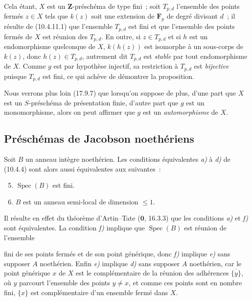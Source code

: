 Cela étant, $X$ est un $\mathbf Z$-préschéma de type fini~; soit $T_{p,d}$
l'ensemble des points fermés $z\in X$ tels que $k(z)$ soit une extension de
$\mathbf F_p$ de degré divisant $d$~; il résulte de (10.4.11.1) que l'ensemble
$T_{p,d}$ est fini et que l'ensemble des points fermés de $X$ est réunion des
$T_{p,d}$. En outre, si $z\in T_{p,d}$ et si $h$ est un endomorphisme
quelconque de $X$, $k(h(z))$ est isomorphe à un sous-corps de $k(z)$, donc
$h(z)\in T_{p,d}$, autrement dit $T_{p,d}$ est \emph{stable} par tout
endomorphisme de $X$. Comme $g$ est par hypothèse injectif, sa restriction à
$T_{p,d}$ est \emph{bijective} puisque $T_{p,d}$ est fini, ce qui achève de
démontrer la proposition.

Nous verrons plus loin (17.9.7) que lorsqu'on suppose de plus, d'une part que
$X$ est un $S$-préschéma de présentation finie, d'autre part que $g$ est un
monomorphisme, alors on peut affirmer que $g$ est un \emph{automorphisme} de
$X$.

\subsection{Préschémas de Jacobson noethériens}
\label{subsection:IV.10.5-fr}

\begin{proposition}[10.5.1]
\label{IV.10.5.1-fr}
Soit $B$ un anneau intègre noethérien. Les conditions équivalentes \emph{a)} à
\emph{d)} de (10.4.4) sont alors aussi équivalentes aux suivantes~:
\begin{enumerate}[label=\emph{\alph*)}]
  \setcounter{enumi}{4}
  \item $\operatorname{Spec}(B)$ est fini.
  \item $B$ est un anneau semi-local de dimension $\leq1$.
\end{enumerate}
\end{proposition}

Il résulte en effet du théorème d'Artin--Tate ($\mathbf 0$, 16.3.3) que les
conditions \emph{a)} et \emph{f)} sont équivalentes. La condition \emph{f)}
implique que $\operatorname{Spec}(B)$ est réunion de l'ensemble

fini de ses points fermés et de son point générique, donc \emph{f)} implique
\emph{e)} sans supposer $A$ noethérien. Enfin \emph{e)} implique \emph{d)} sans
supposer $A$ noethérien, car le point générique $x$ de $X$ est le complémentaire
de la réunion des adhérences $\overline{\{y\}}$, où $y$ parcourt l'ensemble des
points $y\neq x$, et comme ces points sont en nombre fini, $\{x\}$ est
complémentaire d'un ensemble fermé dans $X$.

